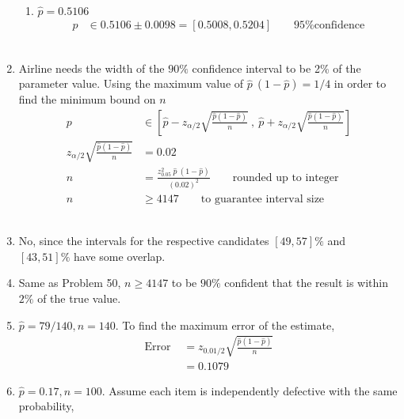 \begin{enumerate}
\begin{enumerate}
			\item $ \widehat{p}  = 0.5106$ \\
			\begin{align}
				p &\in 0.5106 \pm 0.0098 = [0.5008, 0.5204] \qquad \text{95\% confidence}
			\end{align} \\
		\end{enumerate}
	
	
	\item  Airline needs the width of the $ 90\% $ confidence interval to be 2\% of the parameter value. Using the maximum value of $ \widehat{p}\ (1-\widehat{p}) = 1/4 $ in order to find the minimum bound on $ n $\\
	
	
		\begin{align}		
			p &\in \left[ \widehat{p} - z_{\alpha/2}\sqrt{\frac{\widehat{p}(1-\widehat{p})}{n}}\ ,\ \widehat{p} + z_{\alpha/2}\sqrt{\frac{\widehat{p}(1-\widehat{p})}{n}}  \right] \nonumber \\
			z_{\alpha/2}\sqrt{\frac{\widehat{p}(1-\widehat{p})}{n}} &= 0.02 \nonumber \\
			n &= \frac{z_{0.05}^2\ \widehat{p}\ (1-\widehat{p})}{(0.02)^2} \qquad \text{rounded up to integer} \nonumber \\
			n &\geq 4147 \qquad \text{to guarantee interval size}
		\end{align}\\
	
	
	\item No, since the intervals for the respective candidates $ [49, 57]\% $ and $ [43, 51]\% $ have some overlap.\\
	
	\item Same as Problem 50, $ n \geq 4147 $ to be $ 90\% $ confident that the result is within $ 2\% $ of the true value. \\
	
	\item $ \widehat{p}  = 79/140, n = 140$. To find the maximum error of the estimate, \\
	
		\begin{align}
			\text{Error } &= z_{0.01/2}\sqrt{\frac{\widehat{p}(1-\widehat{p})}{n}} \nonumber \\
			&= 0.1079
		\end{align}
	
	
	\item $ \widehat{p}  = 0.17, n = 100$. Assume each item is independently defective with the same probability, \\
	

\end{enumerate}
